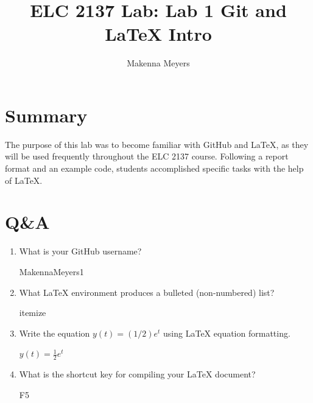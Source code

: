 \documentclass[11pt]{article}
\begin{document}
\title{ELC 2137 Lab: Lab 1 Git and LaTeX Intro}
\author{Makenna Meyers}

\maketitle


\section*{Summary}

The purpose of this lab was to become familiar with GitHub and LaTeX, as they will be used frequently throughout the ELC 2137 course. Following a report format and an example code, students accomplished specific tasks with the help of LaTeX. 


\section*{Q\&A}

\begin{enumerate}
	\item What is your GitHub username?
	
	MakennaMeyers1
	
	\item What LaTeX environment produces a bulleted (non-numbered) list?
	
	itemize
	
	\item Write the equation $y(t) = (1/2)e^t$ using LaTeX equation formatting.
	
	$y(t) = \frac{1}{2}e^t$
	
	\item What is the shortcut key for compiling your LaTeX document?
	
	F5
\end{enumerate}
\end{document}
